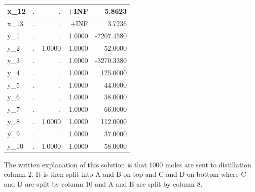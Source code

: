 \documentclass[11pt]{article}
\begin{document}
\begin{table}[htbp]
\begin{tabular}{|l|r|r|r|r|}
x\_12             & .              & .              & +INF           & 5.8623            \\ \hline
x\_13             & .              & .              & +INF           & 3.7236            \\ \hline
y\_1              & .              & .              & 1.0000         & -7207.4580        \\ \hline
y\_2              & .              & 1.0000         & 1.0000         & 52.0000           \\ \hline
y\_3              & .              & .              & 1.0000         & -3270.3380        \\ \hline
y\_4              & .              & .              & 1.0000         & 125.0000          \\ \hline
y\_5              & .              & .              & 1.0000         & 44.0000           \\ \hline
y\_6              & .              & .              & 1.0000         & 38.0000           \\ \hline
y\_7              & .              & .              & 1.0000         & 66.0000           \\ \hline
y\_8              & .              & 1.0000         & 1.0000         & 112.0000          \\ \hline
y\_9              & .              & .              & 1.0000         & 37.0000           \\ \hline
y\_10             & .              & 1.0000         & 1.0000         & 58.0000           \\ \hline
\end{tabular}
\end{table}

The written explanation of this solution is that 1000 moles are sent to distillation column 2.
It is then split into A and B on top and C and D on bottom where C and D are split by column 10 and A and B are split by column 8.
\end{document}
